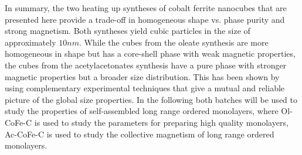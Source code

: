 \documentclass[\main/dresen_thesis.tex]{subfiles}
\begin{document}
  \label{sec:monolayers:nanoparticle:discussion:summary}
  In summary, the two heating up syntheses of cobalt ferrite nanocubes that are presented here provide a trade-off in homogeneous shape vs. phase purity and strong magnetism.
  Both syntheses yield cubic particles in the size of approximately $10 \unit{nm}$.
  While the cubes from the oleate synthesis are more homogeneous in shape but has a core-shell phase with weak magnetic properties, the cubes from the acetylacetonates synthesis have a pure phase with stronger magnetic properties but a broader size distribution.
  This has been shown by using complementary experimental techniques that give a mutual and reliable picture of the global size properties.
  In the following both batches will be used to study the properties of self-assembled long range ordered monolayers, where Ol-CoFe-C is used to study the parameters for preparing high quality monolayers, Ac-CoFe-C is used to study the collective magnetism of long range ordered monolayers.
\end{document}
